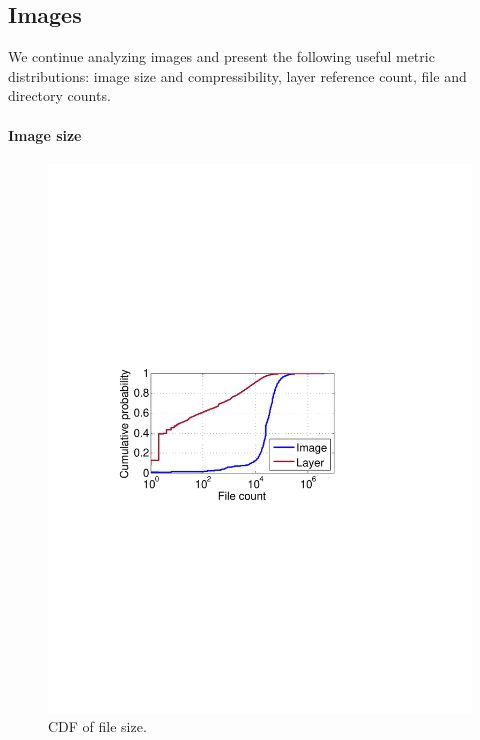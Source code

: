 \subsection{Images}
\label{sec:images}

We continue analyzing images and present the following useful metric distributions: image size and compressibility, layer reference count, file and directory
counts. 

\paragraph{Image size}%

\begin{figure}[t]
	\centering
	\begin{minipage}{0.22\textwidth}
		\centering
		\includegraphics[width=1\textwidth]{graphs/file-cnt-cdf.pdf}
		\caption{CDF of file size.}
		\label{fig:file-cnt-cdf}
	\end{minipage}
	\begin{minipage}{0.22\textwidth}

\end{minipage}
\end{figure}
